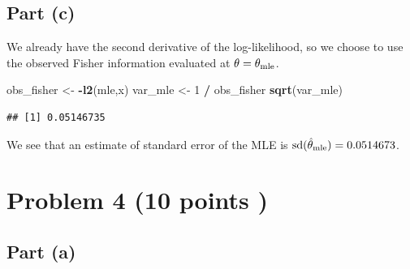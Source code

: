 \documentclass[
]{article}
\newenvironment{Shaded}{\begin{snugshade}}{\end{snugshade}}
\newcommand{\DecValTok}[1]{\textcolor[rgb]{0.00,0.00,0.81}{#1}}
\newcommand{\FunctionTok}[1]{\textcolor[rgb]{0.13,0.29,0.53}{\textbf{#1}}}
\newcommand{\NormalTok}[1]{#1}
\newcommand{\OtherTok}[1]{\textcolor[rgb]{0.56,0.35,0.01}{#1}}
\newcommand{\SpecialCharTok}[1]{\textcolor[rgb]{0.81,0.36,0.00}{\textbf{#1}}}
\begin{document}
\hypertarget{part-c}{%
\subsection{Part (c)}\label{part-c}}


We already have the second derivative of the log-likelihood, so we
choose to use the observed Fisher information evaluated at
\(\theta = \theta_{\rm{mle}}\).

\begin{Shaded}
\begin{Highlighting}[]
\NormalTok{obs\_fisher }\OtherTok{\textless{}{-}} \SpecialCharTok{{-}}\FunctionTok{l2}\NormalTok{(mle,x)}
\NormalTok{var\_mle }\OtherTok{\textless{}{-}} \DecValTok{1} \SpecialCharTok{/}\NormalTok{ obs\_fisher}
\FunctionTok{sqrt}\NormalTok{(var\_mle)}
\end{Highlighting}
\end{Shaded}

\begin{verbatim}
## [1] 0.05146735
\end{verbatim}

We see that an estimate of standard error of the MLE is
\(\operatorname{sd}(\hat{\theta}_{\rm{mle}}) = 0.0514673\).

\hypertarget{problem-4-10-points}{%
\section{Problem 4 (10 points )}\label{problem-4-10-points}}


\hypertarget{part-a-2}{%
\subsection{Part (a)}\label{part-a-2}}

\end{document}
